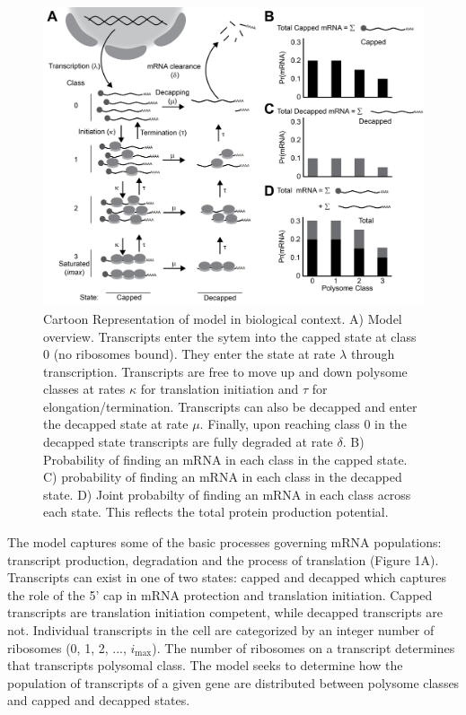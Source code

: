 \documentclass[a4,center,fleqn,nocrop]{NAR}
\newcommand{\imax}{\ensuremath{{i_{\max}}}\xspace}
\begin{document}
\begin{figure}[!ht]
\begin{center}
\includegraphics[width=120mm]{Images/Figure1_biomodel_V3.png}
\caption{Cartoon Representation of model in biological context. A) Model overview. Transcripts enter the sytem into the capped state at class 0 (no ribosomes bound). They enter the state at rate $\lambda$ through transcription. Transcripts are free to move up and down polysome classes at rates $\kappa$ for translation initiation and $\tau$ for elongation/termination. Transcripts can also be decapped and enter the decapped state at rate $\mu$. Finally, upon reaching class 0 in the decapped state transcripts are fully degraded at rate $\delta$. B) Probability of finding an mRNA in each class in the capped state. C) probability of finding an mRNA in each class in the decapped state. D) Joint probabilty of finding an mRNA in each class across each state. This reflects the total protein production potential.}
\end{center}
\end{figure}


The model captures some of the basic processes governing mRNA populations: transcript production, degradation and the process of translation (Figure 1A).
Transcripts can exist in one of two states: capped and decapped which captures the role of the 5' cap in mRNA protection and translation initiation. 
Capped transcripts are translation initiation competent, while decapped transcripts are not. 
Individual transcripts in the cell are categorized by an integer number of ribosomes (0, 1, 2, ..., \imax).
The number of ribosomes on a transcript determines that transcripts polysomal class.
The model seeks to determine how the population of transcripts of a given gene are distributed between polysome classes and capped and decapped states.
\end{document}
